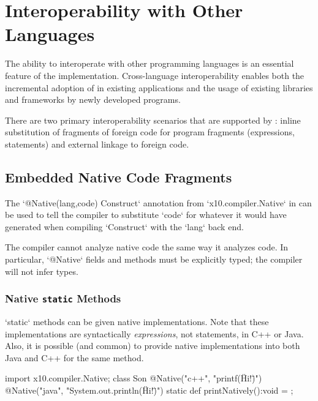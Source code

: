 \chapter{Interoperability with Other Languages}
\label{NativeCode}
\label{Interoperability}

The ability to interoperate with other programming languages is an
essential feature of the \Xten{} implementation.  Cross-language
interoperability enables both the incremental adoption of \Xten{} in
existing applications and the usage of existing libraries and
frameworks by newly developed \Xten{} programs. 

There are two primary interoperability scenarios that are supported by
\XtenCurrVer{}: inline substitution of fragments of foreign code for
\Xten program fragments (expressions, statements) and external linkage
to foreign code.

\section{Embedded Native Code Fragments}

The
\xcd`@Native(lang,code) Construct` annotation from \xcd`x10.compiler.Native` in
\Xten{} can be used to tell the \Xten{} compiler to substitute \xcd`code` for
whatever it would have generated when compiling \xcd`Construct`
with the \xcd`lang` back end.

The compiler cannot analyze native code the same way it analyzes \Xten{} code.  In
particular, \xcd`@Native` fields and methods must be explicitly typed; the
compiler will not infer types.


\subsection{Native {\tt static} Methods}

\xcd`static` methods can be given native implementations.  Note that these
implementations are syntactically {\em expressions}, not statements, in C++ or
Java.   Also, it is possible (and common) to provide native implementations
into both Java and C++ for the same method.
\begin{xten}
import x10.compiler.Native;
class Son {
  @Native("c++", "printf(\"Hi!\")")
  @Native("java", "System.out.println(\"Hi!\")")
  static def printNatively():void = {};
}
\end{xten}
%

